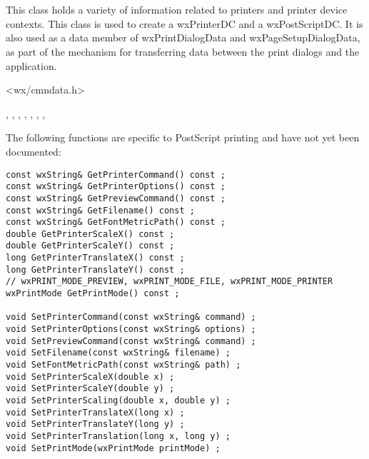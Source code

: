 \section{}\label{wxprintdata}

This class holds a variety of information related to printers and
printer device contexts. This class is used to create a wxPrinterDC
and a wxPostScriptDC. It is also used as a data member of wxPrintDialogData
and wxPageSetupDialogData, as part of the mechanism for transferring data
between the print dialogs and the application.




<wx/cmndata.h>


, 
, 
, 
, 
, 
, 
, 


The following functions are specific to PostScript printing
and have not yet been documented:

\begin{verbatim}
const wxString& GetPrinterCommand() const ;
const wxString& GetPrinterOptions() const ;
const wxString& GetPreviewCommand() const ;
const wxString& GetFilename() const ;
const wxString& GetFontMetricPath() const ;
double GetPrinterScaleX() const ;
double GetPrinterScaleY() const ;
long GetPrinterTranslateX() const ;
long GetPrinterTranslateY() const ;
// wxPRINT_MODE_PREVIEW, wxPRINT_MODE_FILE, wxPRINT_MODE_PRINTER
wxPrintMode GetPrintMode() const ;

void SetPrinterCommand(const wxString& command) ;
void SetPrinterOptions(const wxString& options) ;
void SetPreviewCommand(const wxString& command) ;
void SetFilename(const wxString& filename) ;
void SetFontMetricPath(const wxString& path) ;
void SetPrinterScaleX(double x) ;
void SetPrinterScaleY(double y) ;
void SetPrinterScaling(double x, double y) ;
void SetPrinterTranslateX(long x) ;
void SetPrinterTranslateY(long y) ;
void SetPrinterTranslation(long x, long y) ;
void SetPrintMode(wxPrintMode printMode) ;
\end{verbatim}

